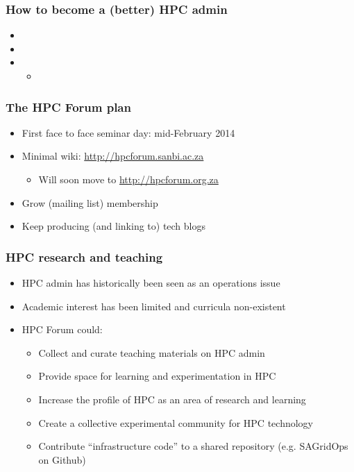 \documentclass[handout]{beamer}
\begin{document}
\begin{frame}
\frametitle{How to become a (better) HPC admin}
\begin{itemize}
  \item {}
  \item {}
  \item {} 
  \begin{itemize}
    \item {}
  \end{itemize} 
\end{itemize}
\end{frame}

\begin{frame}
\frametitle{The HPC Forum plan}
\begin{itemize}
  \item First face to face seminar day: mid-February 2014
  \item Minimal wiki:
  \href{http://hpcforum.sanbi.ac.za}{http://hpcforum.sanbi.ac.za}
  \begin{itemize}
    \item Will soon move to
    \href{http://hpcforum.org.za}{http://hpcforum.org.za}
  \end{itemize}
  \item Grow (mailing list) membership
  \item Keep producing (and linking to) tech blogs
\end{itemize}
\end{frame}

\begin{frame}
\frametitle{HPC research and teaching}
\begin{itemize}
    \item HPC admin has historically been seen as an operations issue
    \item Academic interest has been limited and curricula non-existent
    \pause
    \item HPC Forum could:
    \begin{itemize}
      \item Collect and curate teaching materials on HPC admin
      \item Provide space for learning and experimentation in HPC
      \item Increase the profile of HPC as an area of research and learning
      \item Create a collective experimental community for HPC technology
      \item Contribute ``infrastructure code'' to a shared repository (e.g.
      SAGridOps on Github)
    \end{itemize}
\end{itemize}
\end{frame}
\end{document}
